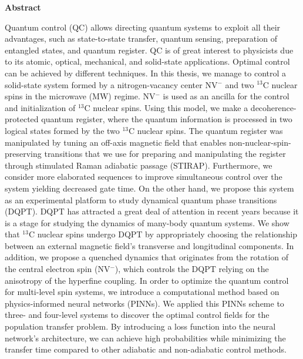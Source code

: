 \rhead{}
\lhead{}
\renewcommand{\headrulewidth}{0pt}
\begin{center}
    \Large
    \textbf{\newtitle}
    
    \large
    \vspace{0.4cm}
    \newauthor
    \vspace{0.9cm}
    
    \textbf{Abstract}\\
\end{center}


Quantum control (QC) allows directing quantum systems to exploit all their advantages, such as state-to-state transfer, quantum sensing, preparation of entangled states, and quantum register. QC is of great interest to physicists due to its atomic, optical, mechanical, and solid-state applications. Optimal control can be achieved by different techniques. In this thesis, we manage to control a solid-state system formed by a nitrogen-vacancy center NV$^{-}$ and two $^{13}$C nuclear spins in the microwave (MW) regime. NV$^{-}$ is used as an ancilla for the control and initialization of $^{13}$C nuclear spins. Using this model, we make a decoherence-protected quantum register, where the quantum information is processed in two logical states formed by the two $^{13}$C nuclear spins. The quantum register was manipulated by tuning an off-axis magnetic field that enables non-nuclear-spin-preserving transitions that we use for preparing and manipulating the register through stimulated Raman adiabatic passage (STIRAP). Furthermore, we consider more elaborated sequences to improve simultaneous control over the system yielding decreased gate time. On the other hand, we propose this system as an experimental platform to study dynamical quantum phase transitions (DQPT). DQPT has attracted a great deal of attention in recent years because it is a stage for studying the dynamics of many-body quantum systems. We show that $^{13}$C nuclear spins undergo DQPT by appropriately choosing the relationship between an external magnetic field's transverse and longitudinal components. In addition, we propose a quenched dynamics that originates from the rotation of the central electron spin (NV$^{-}$), which controls the DQPT relying on the anisotropy of the hyperfine coupling. In order to optimize the quantum control for multi-level spin systems, we introduce a computational method based on physics-informed neural networks (PINNs). We applied this PINNs scheme to three- and four-level systems to discover the optimal control fields for the population transfer problem. By introducing a loss function into the neural network's architecture, we can achieve high probabilities while minimizing the transfer time compared to other adiabatic and non-adiabatic control methods.

